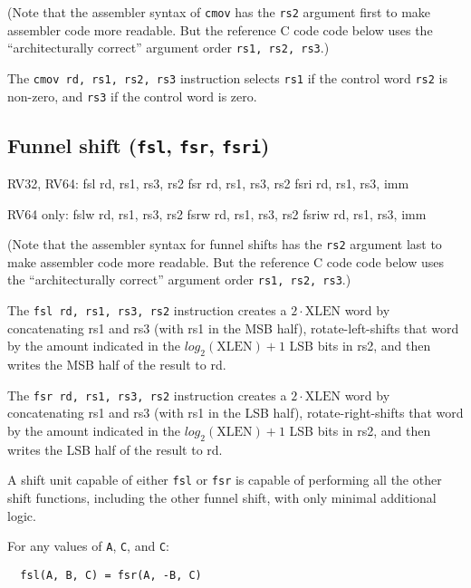 (Note that the assembler syntax of {\tt cmov} has the {\tt rs2} argument first
to make assembler code more readable. But the reference C code code below uses
the ``architecturally correct'' argument order {\tt rs1, rs2, rs3}.)

The {\tt cmov rd, rs1, rs2, rs3} instruction selects {\tt rs1} if the control
word {\tt rs2} is non-zero, and {\tt rs3} if the control word is zero.



\subsection{Funnel shift ({\tt fsl}, {\tt fsr}, {\tt fsri})}

\begin{rvb}
  RV32, RV64:
    fsl  rd, rs1, rs3, rs2
    fsr  rd, rs1, rs3, rs2
    fsri rd, rs1, rs3, imm

  RV64 only:
    fslw  rd, rs1, rs3, rs2
    fsrw  rd, rs1, rs3, rs2
    fsriw rd, rs1, rs3, imm
\end{rvb}

(Note that the assembler syntax for funnel shifts has the {\tt rs2} argument
last to make assembler code more readable. But the reference C code code below
uses the ``architecturally correct'' argument order {\tt rs1, rs2, rs3}.)

The {\tt fsl rd, rs1, rs3, rs2} instruction creates a $2\cdot\textrm{XLEN}$ word
by concatenating rs1 and rs3 (with rs1 in the MSB half), rotate-left-shifts that
word by the amount indicated in the $log_2(\textrm{XLEN})+1$ LSB bits in rs2, and
then writes the MSB half of the result to rd.

The {\tt fsr rd, rs1, rs3, rs2} instruction creates a $2\cdot\textrm{XLEN}$ word
by concatenating rs1 and rs3 (with rs1 in the LSB half), rotate-right-shifts that
word by the amount indicated in the $log_2(\textrm{XLEN})+1$ LSB bits in rs2, and
then writes the LSB half of the result to rd.





A shift unit capable of either {\tt fsl} or {\tt fsr} is capable of performing all
the other shift functions, including the other funnel shift, with only minimal additional
logic.

For any values of {\tt A}, {\tt C}, and {\tt C}:

\begin{minipage}{\linewidth}
\begin{verbatim}
  fsl(A, B, C) = fsr(A, -B, C)
\end{verbatim}
\end{minipage}

